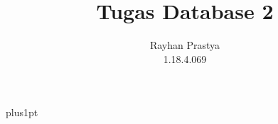 \documentclass[12pt]{ociamthesis}  %
\title{ Tugas Database 2\\
}   %
\author{Rayhan Prastya \\
1.18.4.069}             %
\begin{document}
\baselineskip=18pt plus1pt

\setcounter{secnumdepth}{3}
\setcounter{tocdepth}{3}


\maketitle                  %

\begin{romanpages}          %
\tableofcontents            %
\end{romanpages}            %


% 
%
%
%
%
%
%
%
%
\end{document}
